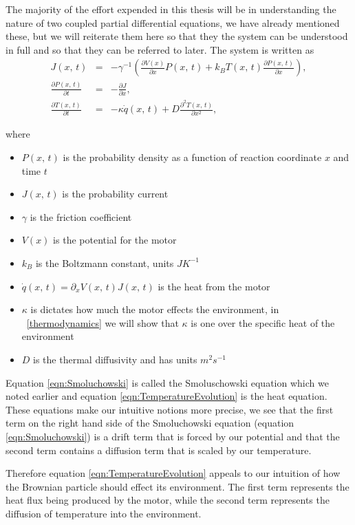 The majority of the effort expended in this thesis will be in understanding the nature of two coupled partial differential equations, we have already mentioned these, but we will reiterate them here so that they the system can be understood in full and so that they can be referred to later. The system is written as
\begin{eqnarray}
J(x, \, t) &=& -\gamma^{-1} \left ( \frac{\partial V(x)}{\partial x} P(x, \, t) + k_B T(x, \, t) \frac{\partial P(x, \, t)}{\partial x} \right ), \label{eqn:current} \\
\frac{\partial P(x, \, t)}{\partial t} &=& -\frac{\partial J}{\partial x}, \label{eqn:Smoluchowski} \\
\frac{\partial T(x, \, t)}{\partial t} &=& -\kappa \dot{q}(x, \, t) + D \frac{\partial^2 T(x, 
\, t)}{\partial x^2}, \label{eqn:TemperatureEvolution}
\end{eqnarray}

where
\begin{itemize}
\item{$P(x, \, t)$ is the probability density as a function of  reaction coordinate $x$ and time $t$}
\item{$J(x, \, t)$ is the probability current}
\item{$\gamma$ is the friction coefficient}
\item{$V(x)$ is the potential for the motor}
\item{$k_B$ is the Boltzmann constant, units $J K^{-1}$}
\item{$\dot{q}(x, \, t) = \partial_x V(x, \, t) J(x, \, t)$ is the heat from the motor}
\item{$\kappa$ is dictates how much the motor effects the environment, in ~\autoref{thermodynamics} we will show that $\kappa$ is one over the specific heat of the environment}
\item{$D$ is the thermal diffusivity and has units $m^2 s^{-1}$}
\end{itemize}
Equation \ref{eqn:Smoluchowski} is called the Smoluschowski equation which we noted earlier and equation \ref{eqn:TemperatureEvolution} is the heat equation. These equations make our intuitive notions more precise, we see that the first term on the right hand side of the Smoluchowski equation (equation \ref{eqn:Smoluchowski}) is a drift term that is forced by our potential and that the second term contains a diffusion term that is scaled by our temperature.

Therefore equation \ref{eqn:TemperatureEvolution} appeals to our intuition of how the Brownian particle should effect its environment. The first term represents the heat flux being produced by the motor, while the second term represents the diffusion of temperature into the environment.

